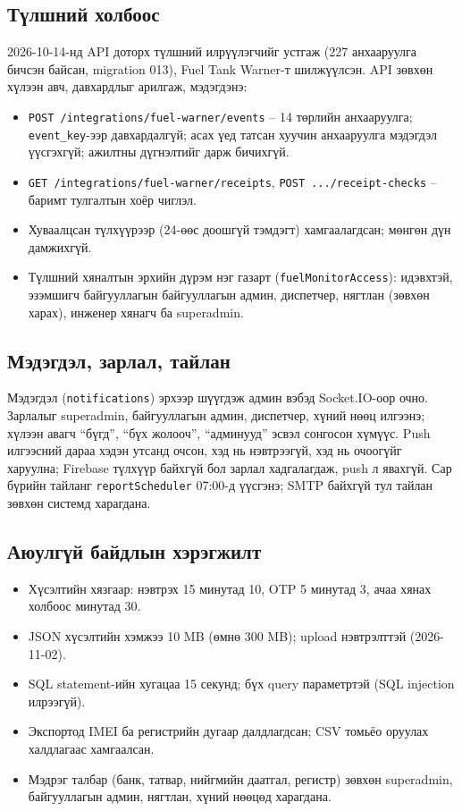 \documentclass[
12pt,
oneside,
english,
onehalfspacing,
nolistspacing,
headsepline,
]{MUST-Thesis}
\begin{document}
\subsection{Түлшний холбоос}

2026-10-14-нд API доторх түлшний илрүүлэгчийг устгаж (227 анхааруулга бичсэн байсан, migration 013), Fuel Tank Warner-т шилжүүлсэн. API зөвхөн хүлээн авч, давхардлыг арилгаж, мэдэгдэнэ:
\begin{itemize}
    \item \texttt{POST /integrations/fuel-warner/events} -- 14 төрлийн анхааруулга; \texttt{event\_key}-ээр давхардалгүй; асах үед татсан хуучин анхааруулга мэдэгдэл үүсгэхгүй; ажилтны дүгнэлтийг дарж бичихгүй.
    \item \texttt{GET /integrations/fuel-warner/receipts}, \texttt{POST .../receipt-checks} -- баримт тулгалтын хоёр чиглэл.
    \item Хуваалцсан түлхүүрээр (24-өөс доошгүй тэмдэгт) хамгаалагдсан; мөнгөн дүн дамжихгүй.
    \item Түлшний хяналтын эрхийн дүрэм нэг газарт (\texttt{fuelMonitorAccess}): идэвхтэй, эзэмшигч байгууллагын байгууллагын админ, диспетчер, нягтлан (зөвхөн харах), инженер хянагч ба superadmin.
\end{itemize}

\subsection{Мэдэгдэл, зарлал, тайлан}

Мэдэгдэл (\texttt{notifications}) эрхээр шүүгдэж админ вэбэд Socket.IO-оор очно. Зарлалыг superadmin, байгууллагын админ, диспетчер, хүний нөөц илгээнэ; хүлээн авагч ``бүгд'', ``бүх жолооч'', ``админууд'' эсвэл сонгосон хүмүүс. Push илгээсний дараа хэдэн утсанд очсон, хэд нь нэвтрээгүй, хэд нь очоогүйг харуулна; Firebase түлхүүр байхгүй бол зарлал хадгалагдаж, push л явахгүй. Сар бүрийн тайланг \texttt{reportScheduler} 07:00-д үүсгэнэ; SMTP байхгүй тул тайлан зөвхөн системд харагдана.

\subsection{Аюулгүй байдлын хэрэгжилт}

\begin{itemize}
    \item Хүсэлтийн хязгаар: нэвтрэх 15 минутад 10, OTP 5 минутад 3, ачаа хянах холбоос минутад 30.
    \item JSON хүсэлтийн хэмжээ 10 MB (өмнө 300 MB); upload нэвтрэлттэй (2026-11-02).
    \item SQL statement-ийн хугацаа 15 секунд; бүх query параметртэй (SQL injection илрээгүй).
    \item Экспортод IMEI ба регистрийн дугаар далдлагдсан; CSV томьёо оруулах халдлагаас хамгаалсан.
    \item Мэдрэг талбар (банк, татвар, нийгмийн даатгал, регистр) зөвхөн superadmin, байгууллагын админ, нягтлан, хүний нөөцөд харагдана.
\end{itemize}
\end{document}
